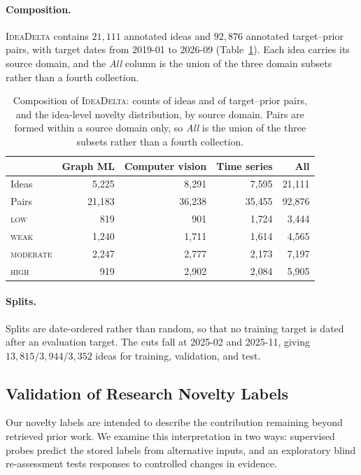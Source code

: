 \paragraph{Composition.}
\textsc{IdeaDelta} contains $21{,}111$ annotated ideas and $92{,}876$ annotated
target--prior pairs, with target dates from 2019-01 to 2026-09
(Table~\ref{tab:dataset-composition}). Each idea carries its source domain, and
the \emph{All} column is the union of the three domain subsets rather than a
fourth collection.

\begin{table}[t]
\centering
\small
\setlength{\tabcolsep}{6pt}
\caption{Composition of \textsc{IdeaDelta}: counts of ideas and of
target--prior pairs, and the idea-level novelty distribution, by source domain.
Pairs are formed within a source domain only, so \emph{All} is the union of the
three subsets rather than a fourth collection.}
\label{tab:dataset-composition}
\begin{tabular}{@{}lrrrr@{}}
\toprule
& Graph ML & Computer vision & Time series & All \\
\midrule
Ideas & 5{,}225 & 8{,}291 & 7{,}595 & 21{,}111 \\
Pairs & 21{,}183 & 36{,}238 & 35{,}455 & 92{,}876 \\
\addlinespace
\textsc{low} & 819 & 901 & 1{,}724 & 3{,}444 \\
\textsc{weak} & 1{,}240 & 1{,}711 & 1{,}614 & 4{,}565 \\
\textsc{moderate} & 2{,}247 & 2{,}777 & 2{,}173 & 7{,}197 \\
\textsc{high} & 919 & 2{,}902 & 2{,}084 & 5{,}905 \\
\bottomrule
\end{tabular}
\end{table}

\paragraph{Splits.}
Splits are date-ordered rather than random, so that no training target is dated
after an evaluation target. The cuts fall at 2025-02 and 2025-11, giving
$13{,}815/3{,}944/3{,}352$ ideas for training, validation, and test.

\subsection{Validation of Research Novelty Labels}
\label{app:dataset-validity}

Our novelty labels are intended to describe the contribution remaining beyond
retrieved prior work. We examine this interpretation in two ways: supervised
probes predict the stored labels from alternative inputs, and an exploratory
blind re-assessment tests responses to controlled changes in evidence.

